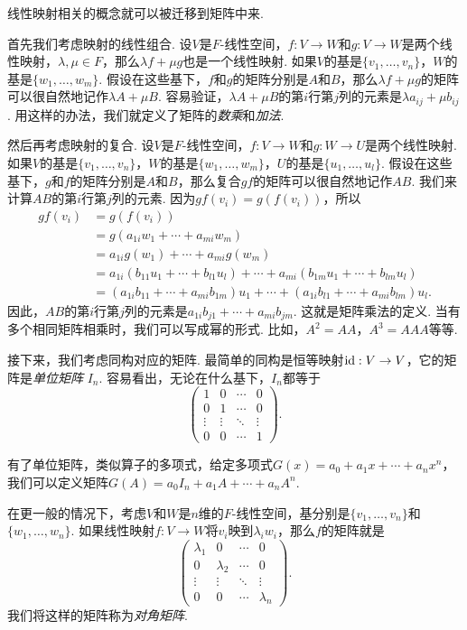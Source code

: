 线性映射相关的概念就可以被迁移到矩阵中来. 

首先我们考虑映射的线性组合. 设$V$是$F$-线性空间，$f:V\to W$和$g:V\to W$是两个线性映射，$\lambda,\mu\in F$，那么$\lambda f+\mu g$也是一个线性映射. 如果$V$的基是$\{v_1,\dots,v_n\}$，$W$的基是$\{w_1,\dots,w_m\}$. 假设在这些基下，$f$和$g$的矩阵分别是$A$和$B$，那么$\lambda f+\mu g$的矩阵可以很自然地记作$\lambda A+\mu B$. 容易验证，$\lambda A+\mu B$的第$i$行第$j$列的元素是$\lambda a_{ij}+\mu b_{ij}$. 用这样的办法，我们就定义了矩阵的\emph{数乘}和\emph{加法}. 


然后再考虑映射的复合. 设$V$是$F$-线性空间，$f:V\to W$和$g:W\to U$是两个线性映射. 如果$V$的基是$\{v_1,\dots,v_n\}$，$W$的基是$\{w_1,\dots,w_m\}$，$U$的基是$\{u_1,\dots,u_l\}$. 假设在这些基下，$g$和$f$的矩阵分别是$A$和$B$，那么复合$gf$的矩阵可以很自然地记作$AB$. 我们来计算$AB$的第$i$行第$j$列的元素. 因为$gf(v_i)=g(f(v_i))$，所以
\begin{align*}
    gf(v_i)&=g(f(v_i))\\
    &=g(a_{1i}w_1+\cdots+a_{mi}w_m)\\
    &=a_{1i}g(w_1)+\cdots+a_{mi}g(w_m)\\
    &=a_{1i}(b_{11}u_1+\cdots+b_{l1}u_l)+\cdots+a_{mi}(b_{1m}u_1+\cdots+b_{lm}u_l)\\
    &=(a_{1i}b_{11}+\cdots+a_{mi}b_{1m})u_1+\cdots+(a_{1i}b_{l1}+\cdots+a_{mi}b_{lm})u_l.
\end{align*}
因此，$AB$的第$i$行第$j$列的元素是$a_{1i}b_{j1}+\cdots+a_{mi}b_{jm}$. 这就是矩阵乘法的定义. 当有多个相同矩阵相乘时，我们可以写成幂的形式. 比如，$A^2=AA$，$A^3=AAA$等等. 

接下来，我们考虑同构对应的矩阵. 最简单的同构是恒等映射$\mathrm{id}:V\to V$，它的矩阵是\emph{单位矩阵} $I_n$. 容易看出，无论在什么基下，$I_n$都等于
\[\begin{pmatrix}
1&0&\cdots&0\\
0&1&\cdots&0\\
\vdots&\vdots&\ddots&\vdots\\
0&0&\cdots&1
\end{pmatrix}.\]

有了单位矩阵，类似算子的多项式，给定多项式$G(x)=a_0+a_1x+\cdots+a_nx^n$，我们可以定义矩阵$G(A)=a_0I_n+a_1A+\cdots+a_nA^n$. 

在更一般的情况下，考虑$V$和$W$是$n$维的$F$-线性空间，基分别是$\{v_1,\dots,v_n\}$和$\{w_1,\dots,w_n\}$. 如果线性映射$f:V\to W$将$v_i$映到$\lambda_i w_i$，那么$f$的矩阵就是
\[\begin{pmatrix}
\lambda_1&0&\cdots&0\\
0&\lambda_2&\cdots&0\\
\vdots&\vdots&\ddots&\vdots\\
0&0&\cdots&\lambda_n
\end{pmatrix}.\]
我们将这样的矩阵称为\emph{对角矩阵}. 

